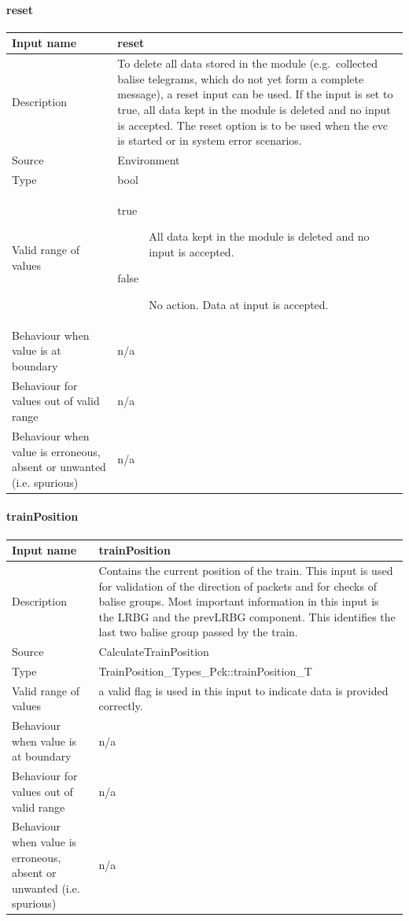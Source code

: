 \paragraph{reset}

\begin{longtable}{p{}p{}}
\toprule
Input name				& reset \\
\midrule
Description				& To delete all data stored in the module (e.g.~collected balise telegrams, which do not yet form a complete message), a reset input can be used. If the input is set to true, all data kept in the module is deleted and no input is accepted. The reset option is to be used when the evc is started or in system error scenarios.\\
\midrule
Source					& Environment \\ 
\midrule
Type					& bool \\
\midrule
Valid range of values	& 
\begin{description}
\item[true] All data kept in the module is deleted and no input is accepted.
\item[false] No action. Data at input is accepted.
\end{description} \\
\midrule
Behaviour when value is at boundary	& n/a\\
\midrule
Behaviour for values out of valid range	& n/a\\
\midrule
Behaviour when value is erroneous, absent or unwanted (i.e. spurious) & n/a\\
\bottomrule
\end{longtable}
\newpage
\paragraph{trainPosition}

\begin{longtable}{p{}p{}}
\toprule
Input name				& trainPosition \\
\midrule
Description				& Contains the current position of the train. This input is used for validation of the direction of packets and for checks of balise groups. Most important information in this input is the LRBG and the prevLRBG component. This identifies the last two balise group passed by the train.\\
\midrule
Source					& CalculateTrainPosition \\ 
\midrule
Type					& TrainPosition\_Types\_Pck::trainPosition\_T \\
\midrule
Valid range of values	& a valid flag is used in this input to indicate data is provided correctly.\\
\midrule
Behaviour when value is at boundary	& n/a\\
\midrule
Behaviour for values out of valid range	& n/a\\
\midrule
Behaviour when value is erroneous, absent or unwanted (i.e. spurious) & n/a\\
\bottomrule
\end{longtable}

